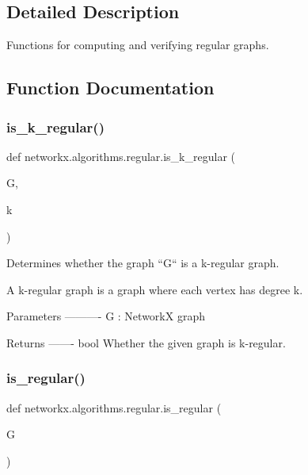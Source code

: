 \subsection{Detailed Description}
\begin{DoxyVerb}Functions for computing and verifying regular graphs.\end{DoxyVerb}
 

\subsection{Function Documentation}
\mbox{\label{namespacenetworkx_1_1algorithms_1_1regular_a988c180a3c8476a8c24dc9b9687ecf4a}} 
\subsubsection{\texorpdfstring{is\+\_\+k\+\_\+regular()}{is\_k\_regular()}}
{\footnotesize\ttfamily def networkx.\+algorithms.\+regular.\+is\+\_\+k\+\_\+regular (\begin{DoxyParamCaption}\item[{}]{G,  }\item[{}]{k }\end{DoxyParamCaption})}

\begin{DoxyVerb}Determines whether the graph ``G`` is a k-regular graph.

A k-regular graph is a graph where each vertex has degree k.

Parameters
----------
G : NetworkX graph

Returns
-------
bool
    Whether the given graph is k-regular.\end{DoxyVerb}
 \mbox{\label{namespacenetworkx_1_1algorithms_1_1regular_abae34f97d8b60cf592b0df161f5787cd}} 
\subsubsection{\texorpdfstring{is\+\_\+regular()}{is\_regular()}}
{\footnotesize\ttfamily def networkx.\+algorithms.\+regular.\+is\+\_\+regular (\begin{DoxyParamCaption}\item[{}]{G }\end{DoxyParamCaption})}

